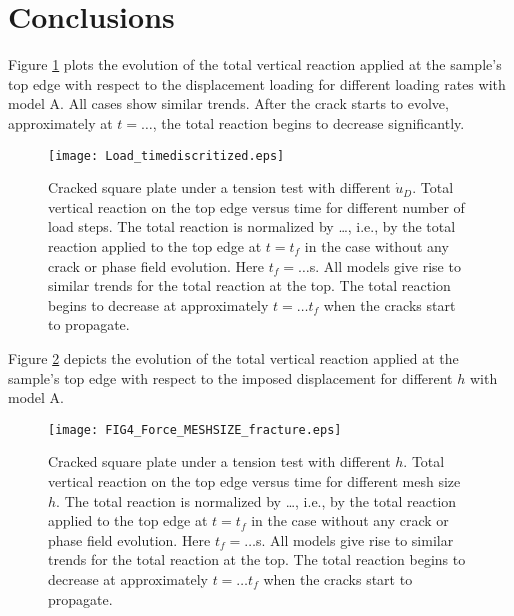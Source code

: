 \section{Conclusions}\label{sec:concl}
Figure \ref{Fig:Load_timediscritized_A} plots the evolution of the total vertical reaction applied at the sample's top edge with respect to the displacement loading for different loading rates with model A. All cases show similar trends. After the crack starts to evolve, approximately at $t=\dots$, the total reaction begins to decrease significantly.

\begin{figure}[htbp]
    \centering
    \texttt{[image: Load\_timediscritized.eps]}
    \caption{{Cracked square plate under a tension test with different $\dot{u}_D$.} Total vertical reaction on the top edge versus time for different number of load steps. The total reaction is normalized by \dots, i.e., by the total reaction applied to the top edge at $t=t_f$ in the case without any crack or phase field evolution. {Here $t_f=\dots$s.}
    All models give rise to similar trends for the total reaction at the top. The total reaction begins to decrease at approximately $t=\dots t_f$ when the cracks start to propagate.}
    \label{Fig:Load_timediscritized_A}
\end{figure}

Figure \ref{Fig:Force_MESHSIZE_fracture_A.eps} depicts the evolution of the total vertical reaction applied at the sample's top edge with respect to the imposed displacement for different $h$ with model A.

\begin{figure}[htbp]
    \centering
    \texttt{[image: FIG4\_Force\_MESHSIZE\_fracture.eps]}
    \caption{{Cracked square plate under a tension test with different $h$.} Total vertical reaction on the top edge versus time for different mesh size $h$. The total reaction is normalized by \dots, i.e., by the total reaction applied to the top edge at $t=t_f$ in the case without any crack or phase field evolution. {Here $t_f=\dots$s.}
    All models give rise to similar trends for the total reaction at the top. The total reaction begins to decrease at approximately $t=\dots t_f$ when the cracks start to propagate.}
    \label{Fig:Force_MESHSIZE_fracture_A.eps}
\end{figure}

